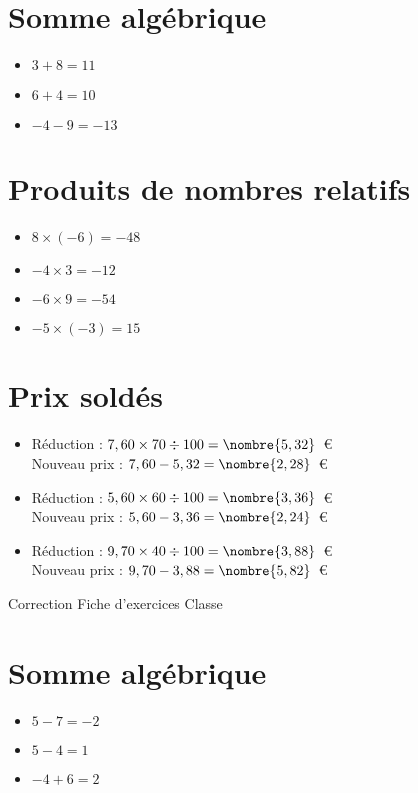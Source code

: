 \documentclass[a4paper,11pt,fleqn]{article}
\begin{document}
\section{Somme algébrique}
\begin{itemize}

  \item $3 +8=11$
  \item $6 +4=10$
  \item $-4 -9=-13$
\end{itemize}

\section{Produits de nombres relatifs}
\begin{itemize}

  \item $8\times(-6)=-48$
  \item $-4\times3=-12$
  \item $-6\times9=-54$
  \item $-5\times(-3)=15$
\end{itemize}

\section{Prix soldés}
\begin{itemize}

  \item Réduction : $7,60\times70\div100=\nombre{5,32}$~€\\
  Nouveau prix : $7,60-5,32=\nombre{2,28}$~€
  \item Réduction : $5,60\times60\div100=\nombre{3,36}$~€\\
  Nouveau prix : $5,60-3,36=\nombre{2,24}$~€
  \item Réduction : $9,70\times40\div100=\nombre{3,88}$~€\\
  Nouveau prix : $9,70-3,88=\nombre{5,82}$~€
\end{itemize}
\newpage
\setcounter{exo}{0}
\setcounter{section}{0}
{Correction} \hfill {\huge Fiche d'exercices } \hfill {Classe}

\section{Somme algébrique}
\begin{itemize}

  \item $5 -7=-2$
  \item $5 -4=1$
  \item $-4 +6=2$
\end{itemize}
\end{document}
